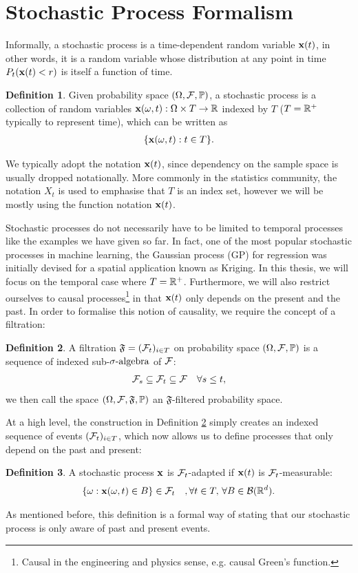 \documentclass[a4paper,12pt,twoside,openright]{report}
\theoremstyle{definition}
\newtheorem{definition}{Definition}[section]
\begin{document}
\section{Stochastic Process Formalism}
Informally, a stochastic process is a time-dependent random variable ${\mathbf{x}}(t)$, in other words, it is a random variable whose distribution at any point in time $P_t({\mathbf{x}}(t) < r)$  is itself a function of time.
\begin{definition}\label{def:stochproc}
Given probability space ${(\Omega, \mathcal{F}, \mathbb{P})}$, a stochastic process is a collection of random variables ${\mathbf{x}}(\omega, t) : \Omega \times T \rightarrow \mathbb{R}$ indexed by $T$ ($T={\mathbb{R}}^{+}$ typically to represent time), which can be written as
\begin{align*}
    \{{\mathbf{x}}(\omega, t) : t \in T\}.
\end{align*}
\end{definition}
We typically adopt the notation ${\mathbf{x}}(t)$, since dependency on the sample space is usually dropped notationally. More commonly in the statistics community, the notation $X_t$ is used to emphasise that $T$ is an index set, however we will be mostly using the function notation ${\mathbf{x}}(t)$. 

Stochastic processes do not necessarily have to be limited to temporal processes like the examples we have given so far. In fact, one of the most popular stochastic processes in machine learning, the Gaussian process (GP) for regression was initially devised for a spatial application known as Kriging. In this thesis, we will focus on the temporal case where $T={\mathbb{R}}^{+}$. Furthermore, we will also restrict ourselves to causal processes\footnote{Causal in the engineering and physics sense, e.g. causal Green's function.} in that ${\mathbf{x}}(t)$ only depends on the present and the past. In order to formalise this notion of causality, we require the concept of a filtration: 
\begin{definition}\label{def:filtration}
A filtration $\mathfrak{F} = ({\mathcal{F}}_{t})_{i\in T}$ on probability space ${(\Omega, \mathcal{F}, \mathbb{P})}$ is a sequence of indexed sub-${\sigma\text{-algebra}}$ of ${\mathcal{F}}$:
\begin{align*}
    {\mathcal{F}}_{s} \subseteq {\mathcal{F}}_{t} \subseteq {\mathcal{F}} \quad \forall  s \leq t,
\end{align*}
we then call the space ${(\Omega, \mathcal{F}, \mathfrak{F}, \mathbb{P})}$ an $\mathfrak{F}$-filtered probability space.
\end{definition}
At a high level, the construction in Definition \ref{def:filtration} simply creates an indexed sequence of events $({\mathcal{F}}_{t})_{i\in T}$, which now allows us to define processes that only depend on the past and present:
\begin{definition}\label{def:adapted}
    A stochastic process ${\mathbf{x}}$ is ${\mathcal{F}}_t$-adapted  if ${\mathbf{x}}(t)$ is ${\mathcal{F}}_t$-measurable:
    \begin{align*}
        \{\omega :{\mathbf{x}}(\omega,t) \in B\} \in {\mathcal{F}}_t \quad, \forall t \in T , \,\forall B \in {\mathcal{B}}({\mathbb{R}}^d).
    \end{align*}
\end{definition}
As mentioned before, this definition is a formal way of stating that our stochastic process is only aware of past and present events.
\end{document}
